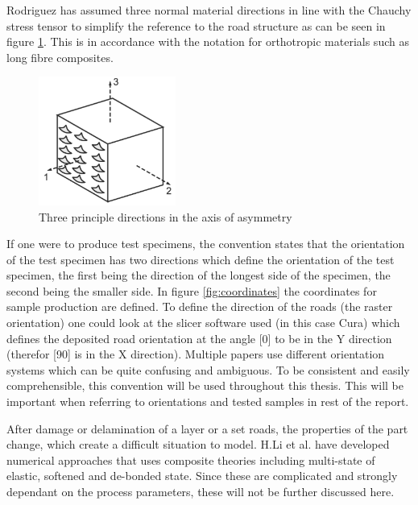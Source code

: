 Rodriguez \cite{Rodriguez2003MechanicalModeling} has assumed three normal material directions in line with the Chauchy stress tensor to simplify the reference to the road structure as can be seen in figure \ref{fig:Principlematerial}. This is in accordance with the notation for orthotropic materials such as long fibre composites.
\begin{figure}[htb]
    \centering
    \includegraphics[width=0.4\textwidth]{chapter_2/figures/Principlematerial.PNG}
    \caption{Three principle directions in the axis of asymmetry}
    \label{fig:Principlematerial}
\end{figure}

If one were to produce test specimens, the convention states that the orientation of the test specimen has two directions which define the orientation of the test specimen, the first being the direction of the longest side of the specimen, the second being the smaller side. In figure \ref{fig:coordinates} the coordinates for sample production are defined. 
To define the direction of the roads (the raster orientation) one could look at the slicer software used (in this case Cura) which defines the deposited road orientation at the angle [0] to be in the Y direction (therefor [90] is in the X direction). Multiple papers use different orientation systems which can be quite confusing and ambiguous. To be consistent and easily comprehensible, this convention will be used throughout this thesis. This will be important when referring to orientations and tested samples in rest of the report. 

After damage or delamination of a layer or a set roads, the properties of the part change, which create a difficult situation to model. H.Li et al. \cite{Li2002CompositeProperties} have developed numerical approaches that uses composite theories including multi-state of elastic, softened and de-bonded state.  Since these are complicated and strongly dependant on the process parameters, these will not be further discussed here. 

